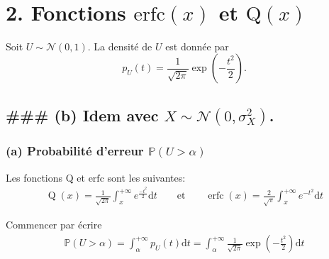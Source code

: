 \documentclass[11pt]{article}
\begin{document}
    \begin{center}
    \end{center}
    { \hspace*{\fill} \\}
    
    \hypertarget{fonctions-mathrmerfcx-et-mathrmqx}{%
\section{\texorpdfstring{2. Fonctions \(\mathrm{erfc}(x)\) et
\(\mathrm{Q}(x)\)}{2. Fonctions \textbackslash mathrm\{erfc\}(x) et \textbackslash mathrm\{Q\}(x)}}\label{fonctions-mathrmerfcx-et-mathrmqx}}

Soit \(U \sim \mathcal{N}(0,1)\). La densité de \(U\) est donnée par
\[p_{U}(t)=\frac{1}{\sqrt{2 \pi}} \exp \left(-\frac{t^{2}}{2}\right).\]

\hypertarget{b-idem-avec-x-simmathcaln0sigma_x2.}{%
\subsection{\texorpdfstring{\#\#\# (b) Idem avec
\(X \sim\mathcal{N}(0,\sigma_{X}^2)\).}{\#\#\# (b) Idem avec X \textbackslash sim\textbackslash mathcal\{N\}(0,\textbackslash sigma\_\{X\}\^{}2).}}\label{b-idem-avec-x-simmathcaln0sigma_x2.}}

    \hypertarget{a-probabilituxe9-derreur-mathbbpu-alpha}{%
\subsubsection{\texorpdfstring{(a) Probabilité d'erreur
\(\mathbb{P}(U > \alpha)\)}{(a) Probabilité d'erreur \textbackslash mathbb\{P\}(U \textgreater{} \textbackslash alpha)}}\label{a-probabilituxe9-derreur-mathbbpu-alpha}}

Les fonctions \(\mathrm{Q}\) et \(\mathrm{erfc}\) sont les suivantes:
\begin{align}
    \operatorname{Q}(x) = \frac{1}{\sqrt{2 \pi}} \int_{x}^{+\infty} e^{\frac{-t^{2}}{2}} \mathrm{d} t \qquad\text{et}\qquad
    \operatorname{erfc}(x)=\frac{2}{\sqrt{\pi}} \int_{x}^{+\infty} e^{-t^{2}} \mathrm{d} t
\end{align}

Commencer par écrire \begin{align}
\mathbb{P}(U > \alpha) = \int_{\alpha}^{+\infty}{p_U(t) \mathrm{d}t} = \int_{\alpha}^{+\infty}{ \frac{1}{\sqrt{2 \pi}} \exp \left(-\frac{t^{2}}{2}\right)\mathrm{d}t}
\end{align}
\end{document}
